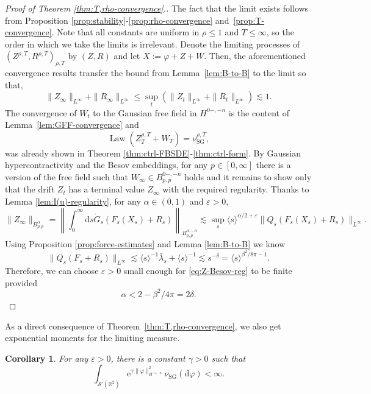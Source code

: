\documentclass[11pt, a4paper]{scrartcl}
\numberwithin{equation}{section}
\theoremstyle{plain}
\newtheorem{corollary}[foo]{Corollary}
\theoremstyle{remark}
\newcommand{\assign}{:=}
\newcommand{\mathd}{\mathrm{d}}
\newcommand{\mathe}{\mathrm{e}}
\newcommand{\tmop}[1]{\ensuremath{\operatorname{#1}}}
\begin{document}
\begin{proof}[Proof of Theorem \ref{thm:T,rho-convergence}.]
	The fact that the limit exists follows from Proposition
	\ref{prop:stability}-\ref{prop:rho-convergence}
	and~\ref{prop:T-convergence}. Note that all constants are uniform in $\rho
		\leqslant 1$ and $T \leqslant \infty$, so the order in which we take the
	limits is irrelevant. Denote the limiting processes of $(Z^{\rho, T},
		R^{\rho, T})_{\rho, T}$ by $(Z, R)$ and let $X \assign \varphi + Z + W$.
	Then, the aforementioned convergence results transfer the bound from
	Lemma~\ref{lem:B-to-B} to the limit so that,
	\[ \| Z_{\infty} \|_{L^{\infty}} + \| R_{\infty} \|_{L^{\infty}} \leqslant
		\sup_t (\| Z_t \|_{L^{\infty}} + \| R_t \|_{L^{\infty}}) \lesssim 1. \]
	The convergence of $W_t$ to the Gaussian free field in $H^{0 -, - n}$ is the
	content of Lemma~\ref{lem:GFF-convergence} and
	\[ \tmop{Law} (Z_T^{\rho, T} + W_T) = \nu_{\tmop{SG}}^{\rho, T}, \]
	was already shown in Theorem \ref{thm:ctrl-FBSDE}-\ref{thm:ctrl-form}. By
	Gaussian hypercontractivity and the Besov embeddings,
	for any $p \in [0, \infty]$ there is a version
	of the free field such that $W_{\infty} \in B_{p, p}^{0 -, - n}$ holds and it
	remains to show only that the drift $Z_t$ has a terminal value $Z_{\infty}$
	with the required regularity. Thanks to Lemma \ref{lem:I(u)-regularity}, for
	any $\alpha \in (0, 1)$ and $\varepsilon > 0$,
	\begin{equation}
		\| Z_{\infty} \|_{B_{p, p}^{\alpha}} = \left\| \int_0^{\infty} \mathd s
		\dot{G}_s (F_s (X_s) + R_s) \right\|_{B_{p, p}^{\alpha, - n}} \lesssim
		\sup_s \langle s \rangle^{\alpha / 2 + \varepsilon} \| Q_s (F_s(X_s) + R_s)
		\|_{L^{\infty}} . \label{eq:Z-Besov-reg}
	\end{equation}
	Using Proposition \ref{prop:force-estimates} and Lemma \ref{lem:B-to-B} we
	know
	\[ \| Q_s (F_s + R_s) \|_{L^{\infty}} \lesssim \langle s \rangle^{- 1}
		\bar{\lambda}_s + \langle s \rangle^{- 1} \lesssim s^{- \delta} = \langle s\rangle^{\beta^2 /
			8 \pi - 1} . \]
	Therefore, we can choose $\varepsilon > 0$ small enough for
	\eqref{eq:Z-Besov-reg} to be finite provided
	\[ \alpha < 2 - \beta^2 / 4 \pi = 2 \delta . \]
\end{proof}

As a direct consequence of Theorem~\ref{thm:T,rho-convergence}, we also get
exponential moments for the limiting measure.

\begin{corollary}
	\label{cor:exp-integrability} For any $\varepsilon > 0$, there is a constant
	$\gamma > 0$ such that
	\[ \int_{\mathcal{S}' (\mathbb{R}^2)} \mathe^{\gamma \| \varphi \|_{H^{-
							\varepsilon, - n}}^2} \nu_{\tmop{SG}} (\mathd \varphi) < \infty . \]
\end{corollary}
\end{document}
